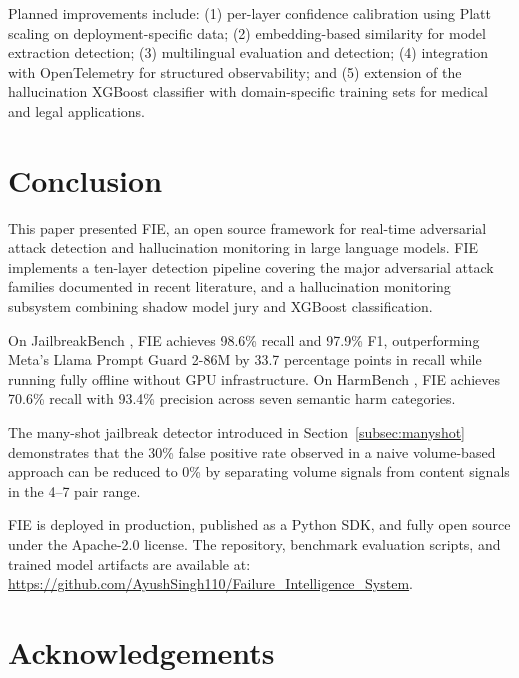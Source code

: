 \documentclass[preprint,12pt,authoryear]{elsarticle}
\begin{document}
Planned improvements include: (1) per-layer confidence calibration
using Platt scaling on deployment-specific data; (2) embedding-based
similarity for model extraction detection; (3) multilingual evaluation
and detection; (4) integration with OpenTelemetry for structured
observability; and (5) extension of the hallucination XGBoost
classifier with domain-specific training sets for medical and legal
applications.

\section{Conclusion}
\label{sec:conclusion}

This paper presented FIE, an open source framework for real-time
adversarial attack detection and hallucination monitoring in large
language models. FIE implements a ten-layer detection pipeline covering
the major adversarial attack families documented in recent literature,
and a hallucination monitoring subsystem combining shadow model jury
and XGBoost classification.

On JailbreakBench \citep{chao2024jailbreakbench}, FIE achieves 98.6\%
recall and 97.9\% F1, outperforming Meta's Llama Prompt Guard 2-86M
by 33.7 percentage points in recall while running fully offline without
GPU infrastructure. On HarmBench \citep{mazeika2024harmbench}, FIE
achieves 70.6\% recall with 93.4\% precision across seven semantic
harm categories.

The many-shot jailbreak detector introduced in Section~\ref{subsec:manyshot}
demonstrates that the 30\% false positive rate observed in a naive
volume-based approach can be reduced to 0\% by separating volume
signals from content signals in the 4--7 pair range.

FIE is deployed in production, published as a Python SDK, and fully
open source under the Apache-2.0 license. The repository, benchmark
evaluation scripts, and trained model artifacts are available at:
\url{https://github.com/AyushSingh110/Failure_Intelligence_System}.

\section*{Acknowledgements}
\end{document}
